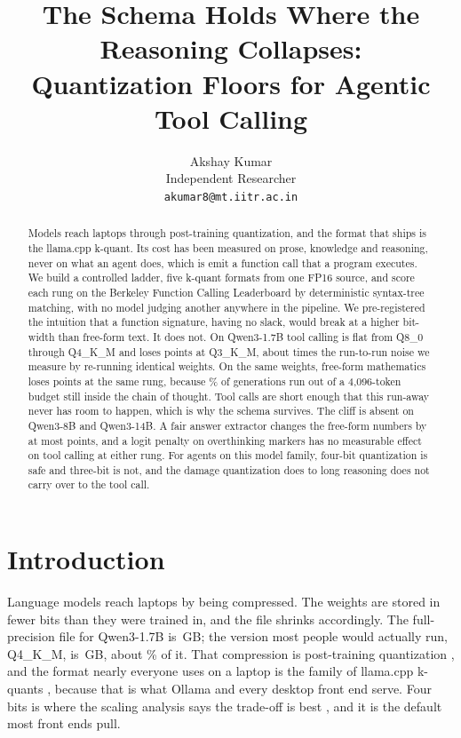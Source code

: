 \documentclass[11pt]{article}
\title{The Schema Holds Where the Reasoning Collapses:\\Quantization Floors for Agentic Tool Calling}
\author{Akshay Kumar\\Independent Researcher\\\texttt{akumar8@mt.iitr.ac.in}}
\date{}
\newcommand{\qm}{Qwen3-1.7B}
\begin{document}
\maketitle

\begin{abstract}
Models reach laptops through post-training quantization, and the format that ships is the llama.cpp k-quant. Its cost has been measured on prose, knowledge and reasoning, never on what an agent does, which is emit a function call that a program executes. We build a controlled ladder, five k-quant formats from one FP16 source, and score each rung on the Berkeley Function Calling Leaderboard by deterministic syntax-tree matching, with no model judging another anywhere in the pipeline. We pre-registered the intuition that a function signature, having no slack, would break at a higher bit-width than free-form text. It does not. On \qm{} tool calling is flat from Q8\_0 through Q4\_K\_M and loses \qtDropThree{} points at Q3\_K\_M, about \qtCliffOverNoise{} times the run-to-run noise we measure by re-running identical weights. On the same weights, free-form mathematics loses \qtGsmDropThree{} points at the same rung, because \qtGsmTruncPctThree{}\% of generations run out of a 4{,}096-token budget still inside the chain of thought. Tool calls are short enough that this run-away never has room to happen, which is why the schema survives. The cliff is absent on Qwen3-8B and Qwen3-14B. A fair answer extractor changes the free-form numbers by at most \qtGsmGapMax{} points, and a logit penalty on overthinking markers has no measurable effect on tool calling at either rung. For agents on this model family, four-bit quantization is safe and three-bit is not, and the damage quantization does to long reasoning does not carry over to the tool call.
\end{abstract}

\section{Introduction}

Language models reach laptops by being compressed. The weights are stored in fewer bits than they were trained in, and the file shrinks accordingly. The full-precision file for \qm{} is \qtSizeFp{}\,GB; the version most people would actually run, Q4\_K\_M, is \qtSizeFour{}\,GB, about \qtCompressFour{}\% of it. That compression is post-training quantization \citep{dettmers2022int8,gptq2023,awq2024}, and the format nearly everyone uses on a laptop is the family of llama.cpp k-quants \citep{llamacpp}, because that is what Ollama and every desktop front end serve. Four bits is where the scaling analysis says the trade-off is best \citep{dettmers2023case,kumar2024precision}, and it is the default most front ends pull.
\end{document}
